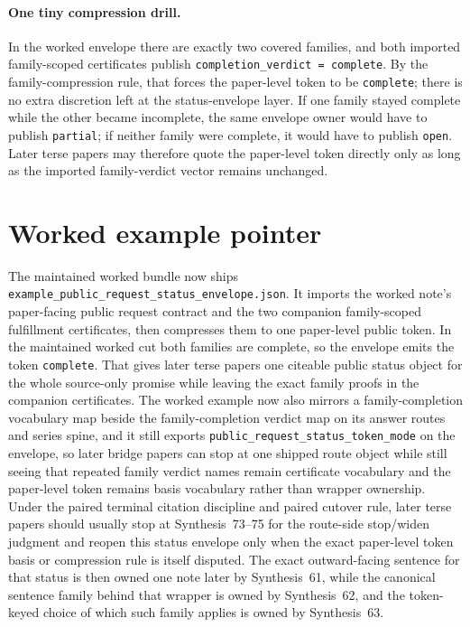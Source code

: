 \documentclass[11pt]{article}
\begin{document}
\paragraph{One tiny compression drill.}
In the worked envelope there are exactly two covered families, and both imported family-scoped certificates publish \texttt{completion\_verdict = complete}. By the family-compression rule, that forces the paper-level token to be \texttt{complete}; there is no extra discretion left at the status-envelope layer. If one family stayed complete while the other became incomplete, the same envelope owner would have to publish \texttt{partial}; if neither family were complete, it would have to publish \texttt{open}. Later terse papers may therefore quote the paper-level token directly only as long as the imported family-verdict vector remains unchanged.\cite{series:workedexample}

\section{Worked example pointer}
The maintained worked bundle now ships \nolinkurl{example_public_request_status_envelope.json}.\cite{series:workedexample}
It imports the worked note's paper-facing public request contract and the two companion family-scoped fulfillment certificates, then compresses them to one paper-level public token.
In the maintained worked cut both families are complete, so the envelope emits the token \texttt{complete}.
That gives later terse papers one citeable public status object for the whole source-only promise while leaving the exact family proofs in the companion certificates. The worked example now also mirrors a family-completion vocabulary map beside the family-completion verdict map on its answer routes and series spine, and it still exports \texttt{public\_request\_status\_token\_mode} on the envelope, so later bridge papers can stop at one shipped route object while still seeing that repeated family verdict names remain certificate vocabulary and the paper-level token remains basis vocabulary rather than wrapper ownership. Under the paired terminal citation discipline and paired cutover rule, later terse papers should usually stop at Synthesis~73--75 for the route-side stop/widen judgment and reopen this status envelope only when the exact paper-level token basis or compression rule is itself disputed. The exact outward-facing sentence for that status is then owned one note later by Synthesis~61, while the canonical sentence family behind that wrapper is owned by Synthesis~62, and the token-keyed choice of which such family applies is owned by Synthesis~63.\cite{series:publicrequestnotices,series:publicrequestnoticenormalforms,series:publicrequestnoticeselections,series:requestsideterminalcitationnormalform,series:pairedterminalcitationdiscipline,series:pairedterminalcutoverrules}
\end{document}
